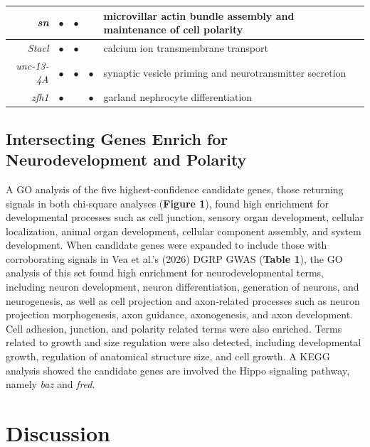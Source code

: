 \documentclass[12pt,reqno,oneside]{report}
\begin{document}
\begin{table}
\begin{tabular}{rcccl}
        \textit{sn}         & \(\bullet \)    & \(\bullet \) & & microvillar actin bundle assembly and maintenance of cell polarity \\ \hline
        \textit{Stacl}      & \(\bullet \)    & \(\bullet \) & & calcium ion transmembrane transport \\ \hline
        \textit{unc-13-4A}  & \(\bullet \)    & \(\bullet \) & \(\bullet \) & synaptic vesicle priming and neurotransmitter secretion \\  \hline
        \textit{zfh1}	    & \(\bullet \)	  &              & \(\bullet \) & garland nephrocyte differentiation \\  \hline
            \end{tabular}
    \label{tab:hits}
\end{table}

\subsection{Intersecting Genes Enrich for Neurodevelopment and Polarity}

A GO analysis of the five highest-confidence candidate genes, those returning signals in both chi-square analyses (\textbf{Figure 1}), found high enrichment for developmental processes such as cell junction, sensory organ development, cellular localization, animal organ development, cellular component assembly, and system development. When candidate genes were expanded to include those with corroborating signals in Vea et al.'s (2026) DGRP GWAS (\textbf{Table 1}), the GO analysis of this set found high enrichment for neurodevelopmental terms, including neuron development, neuron differentiation, generation of neurons, and neurogenesis, as well as cell projection and axon-related processes such as neuron projection morphogenesis, axon guidance, axonogenesis, and axon development. Cell adhesion, junction, and polarity related terms were also enriched. Terms related to growth and size regulation were also detected, including developmental growth, regulation of anatomical structure size, and cell growth. A KEGG analysis showed the candidate genes are involved the Hippo signaling pathway, namely \textit{baz} and \textit{fred}.

\section{Discussion}
\end{document}
